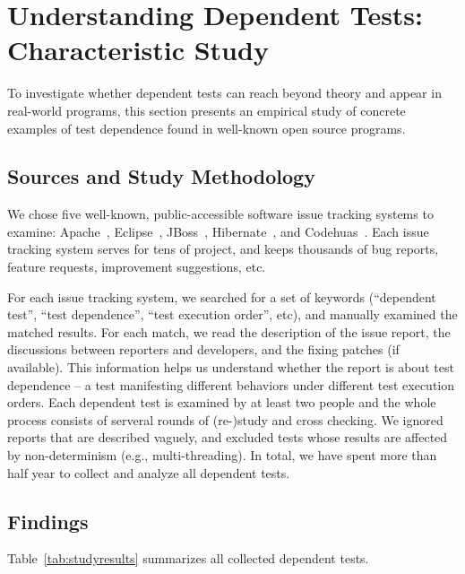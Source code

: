 \section{Understanding Dependent Tests: Characteristic Study}
\label{sec:study}

To investigate whether dependent tests can reach beyond theory
and appear in real-world programs, this section presents an empirical
study of concrete examples of test dependence found in
well-known open source programs. 


\subsection{Sources and Study Methodology}

We chose five well-known, public-accessible software issue
tracking systems to examine: Apache~\cite{apachebug},
Eclipse~\cite{eclipsebug}, JBoss~\cite{jbossbug},
Hibernate~\cite{hibernatebug}, and Codehuas~\cite{codehuasbug}.
Each issue tracking system serves for tens of project, and
keeps thousands of bug reports, feature requests, improvement
suggestions, etc.

For each issue tracking system, we searched for a set of keywords
(``dependent test'', ``test dependence'', ``test execution order'',
etc), and manually examined the matched results. For each match, we read the
description of the issue report, the discussions between reporters
and developers, and the fixing patches (if available). This information
helps us understand whether the report is about test dependence
-- a test manifesting different behaviors under different
test execution orders. Each dependent test is examined by
at least two people and the whole process consists of serveral
rounds of (re-)study and cross checking. We ignored reports
that are described vaguely, and excluded tests whose results are
affected by non-determinism (e.g., multi-threading).
In total, we have spent more than half year to collect and analyze all dependent
tests. 


\subsection{Findings}



Table~\ref{tab:studyresults} summarizes all collected dependent tests.


